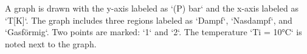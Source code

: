 A graph is drawn with the y-axis labeled as `(P) bar` and the x-axis labeled as `T[K]`. The graph includes three regions labeled as `Dampf`, `Nasdampf`, and `Gasförmig`. Two points are marked: `1` and `2`. The temperature `Ti = 10°C` is noted next to the graph.